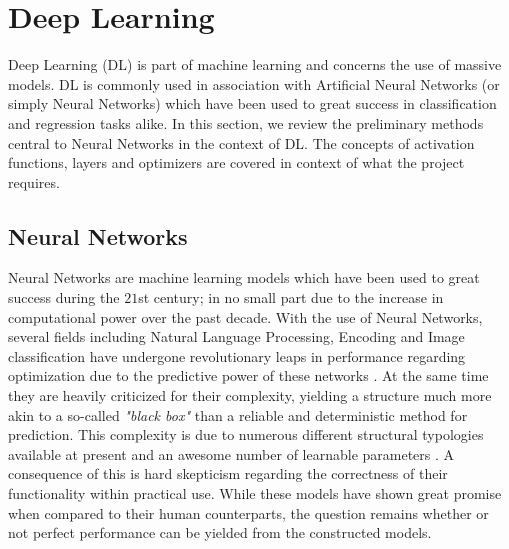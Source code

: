 \section{Deep Learning}

Deep Learning (DL) is part of machine learning and concerns the use of massive models. DL is commonly used in association with Artificial Neural Networks (or simply Neural Networks) which have been used to great success in classification and regression tasks alike. In this section, we review the preliminary methods central to Neural Networks in the context of DL. The concepts of activation functions, layers and optimizers are covered in context of what the project requires. 

\subsection{Neural Networks}
Neural Networks are machine learning models which have been used to great success during the $21$st century; in no small part due to the increase in computational power over the past decade. With the use of Neural Networks, several fields including Natural Language Processing, Encoding and Image classification have undergone revolutionary leaps in performance regarding optimization due to the predictive power of these networks \cite{sharir2020cost, kukacka2012overview, zhang2015deep, lee2017deep}. At the same time they are heavily criticized for their complexity, yielding a structure much more akin to a so-called \textit{"black box"} than a reliable and deterministic method for prediction. This complexity is due to numerous different structural typologies available at present and an awesome number of learnable parameters \cite{qiu2004opening}. A consequence of this is hard skepticism regarding the correctness of their functionality within practical use. While these models have shown great promise when compared to their human counterparts, the question remains whether or not perfect performance can be yielded from the constructed models.

